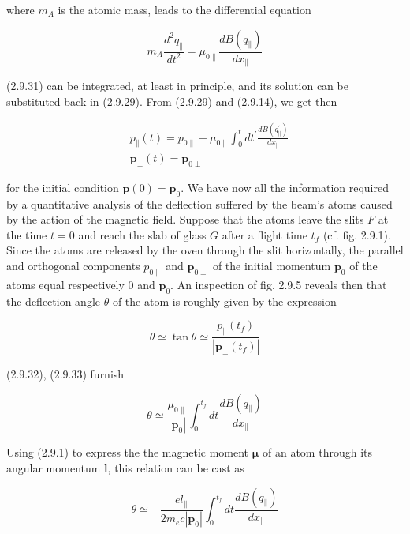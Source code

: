 \documentclass{article}
\begin{document}
where $m_{A}$ is the atomic mass, leads to the differential equation
 
\begin{equation*}
m_{A} \frac{d^{2} q_{\|}}{d t^{2}}=\mu_{0 \|} \frac{d B\left(q_{\|}\right)}{d x_{\|}} \tag{2.9.31}
\end{equation*}
 
(2.9.31) can be integrated, at least in principle, and its solution can be substituted back in (2.9.29). From (2.9.29) and (2.9.14), we get then
 
\begin{align*}
& p_{\|}(t)=p_{0 \|}+\mu_{0 \|} \int_{0}^{t} d t^{\prime} \frac{d B\left(q_{\|}^{\prime}\right)}{d x_{\|}}  \tag{2.9.32}\\
& \boldsymbol{p}_{\perp}(t)=\boldsymbol{p}_{0 \perp} \tag{2.9.33}
\end{align*}
 
for the initial condition $\boldsymbol{p}(0)=\boldsymbol{p}_{0}$.
We have now all the information required by a quantitative analysis of the deflection suffered by the beam's atoms caused by the action of the magnetic field. Suppose that the atoms leave the slits $F$ at the time $t=0$ and reach the slab of glass $G$ after a flight time $t_{f}$ (cf. fig. 2.9.1). Since the atoms are released by the oven through the slit horizontally, the parallel and orthogonal components $p_{0 \|}$ and $\boldsymbol{p}_{0 \perp}$ of the initial momentum $\boldsymbol{p}_{0}$ of the atoms equal respectively 0 and $\boldsymbol{p}_{0}$. An inspection of fig. 2.9.5 reveals then that the deflection angle $\theta$ of the atom is roughly given by the expression
 
\begin{equation*}
\theta \simeq \tan \theta \simeq \frac{p_{\|}\left(t_{f}\right)}{\left|\boldsymbol{p}_{\perp}\left(t_{f}\right)\right|} \tag{2.9.34}
\end{equation*}
 
(2.9.32), (2.9.33) furnish
 
\begin{equation*}
\theta \simeq \frac{\mu_{0 \|}}{\left|\boldsymbol{p}_{0}\right|} \int_{0}^{t_{f}} d t \frac{d B\left(q_{\|}\right)}{d x_{\|}} \tag{2.9.35}
\end{equation*}
 

Using (2.9.1) to express the the magnetic moment $\boldsymbol{\mu}$ of an atom through its angular momentum $\boldsymbol{l}$, this relation can be cast as
 
\begin{equation*}
\theta \simeq-\frac{e l_{\|}}{2 m_{e} c\left|\boldsymbol{p}_{0}\right|} \int_{0}^{t_{f}} d t \frac{d B\left(q_{\|}\right)}{d x_{\|}} \tag{2.9.36}
\end{equation*}
 
\end{document}
